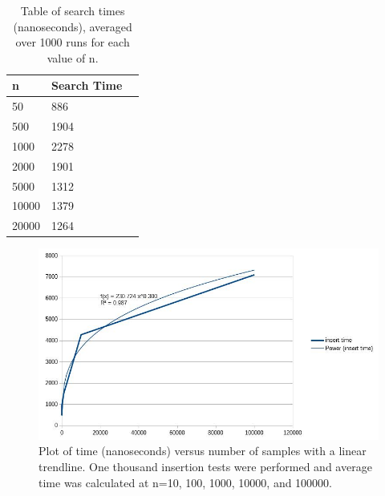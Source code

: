 \documentclass[11pt]{article}
\begin{document}
\begin{table}[!htbp]
\centering
\begin{tabular}{l|ll}
\textbf{n} & \textbf{Search Time} \\ \hline
50                         & 886                  \\
500                        & 1904                 \\
1000                      & 2278                 \\
2000                      & 1901                 \\
5000                     & 1312                 \\
10000                    & 1379                 \\
20000                    & 1264                
\end{tabular}
\caption{Table of search times (nanoseconds), averaged over 1000 runs for each value of n.}
\end{table}

\begin{figure} [!htbp]
	\centering
	\includegraphics[width=6in]{graph1}
	\caption{Plot of time (nanoseconds) versus number of samples with a linear trendline. One thousand insertion tests were performed and average time was calculated at n=10, 100, 1000, 10000, and 100000.}
\end{figure}

\newpage
\end{document}
